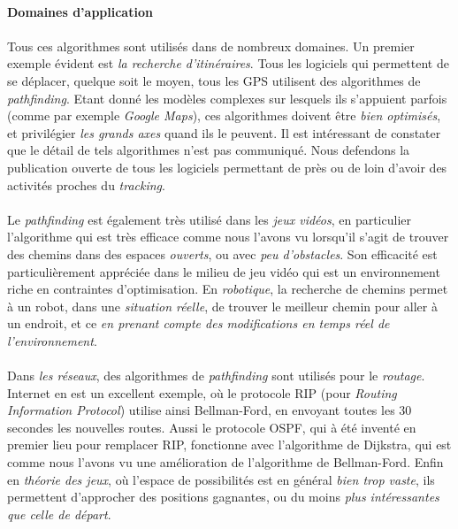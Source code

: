 \paragraph{Domaines d'application}

\paragraph{} Tous ces algorithmes sont utilisés dans de nombreux domaines. Un premier exemple évident
est \emph{la recherche d'itinéraires}. Tous les logiciels qui permettent de se déplacer, quelque soit le moyen,
tous les GPS utilisent des algorithmes de \emph{pathfinding}. Etant donné les modèles complexes sur lesquels
ils s'appuient parfois (comme par exemple \emph{Google Maps}), ces algorithmes doivent être \emph{bien optimisés},
et privilégier \emph{les grands axes} quand ils le peuvent. Il est intéressant de constater que le détail de tels
algorithmes n'est pas communiqué. Nous defendons la publication ouverte de tous les logiciels permettant de près
ou de loin d'avoir des activités proches du \emph{tracking}.

\paragraph{} Le \emph{pathfinding} est également très utilisé dans les \emph{jeux vidéos}, en particulier l'algorithme qui
est très efficace comme nous l'avons vu lorsqu'il s'agit de trouver des chemins dans des espaces \emph{ouverts}, ou
avec \emph{peu d'obstacles}. Son efficacité est particulièrement appréciée dans le milieu de jeu vidéo qui est 
un environnement riche en contraintes d'optimisation. En \emph{robotique}, la recherche de chemins permet à un robot,
dans une \emph{situation réelle}, de trouver le meilleur chemin pour aller à un endroit, et ce \emph{en prenant compte des
modifications en temps réel de l'environnement}.

\paragraph{} Dans \emph{les réseaux}, des algorithmes de \emph{pathfinding} sont utilisés pour le \emph{routage}. Internet
en est un excellent exemple, où le protocole RIP (pour \emph{Routing Information Protocol}) utilise ainsi Bellman-Ford, en
envoyant toutes les 30 secondes les nouvelles routes. \cite{AI1} Aussi le protocole OSPF, qui à été inventé en premier lieu
pour remplacer RIP, fonctionne avec l'algorithme de Dijkstra, qui est comme nous l'avons vu une amélioration de l'algorithme
de Bellman-Ford. Enfin en \emph{théorie des jeux}, où l'espace de possibilités est en général \emph{bien trop vaste}, ils
permettent d'approcher des positions gagnantes, ou du moins \emph{plus intéressantes que celle de départ}.

